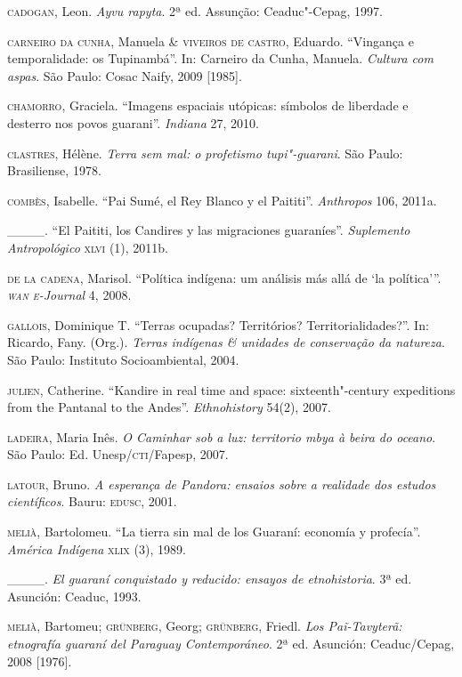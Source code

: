 \begin{Parskip}
\textsc{cadogan}, Leon. \emph{Ayvu rapyta}. 2ª ed. Assunção: Ceaduc"-Cepag, 1997.

\textsc{carneiro da cunha}, Manuela \& \textsc{viveiros de castro}, Eduardo.
``Vingança e temporalidade: os Tupinambá''. In: Carneiro da Cunha,
Manuela. \emph{Cultura com aspas}. São Paulo: Cosac Naify, 2009 [1985].

\textsc{chamorro}, Graciela. ``Imagens espaciais utópicas: símbolos de
liberdade e desterro nos povos guarani''. \emph{Indiana} 27, 2010. 

\textsc{clastres}, Hélène. \emph{Terra sem mal: o profetismo tupi"-guarani}. São
Paulo: Brasiliense, 1978.

\textsc{combès}, Isabelle. ``Pai Sumé, el Rey Blanco y el Paititi''. \emph{Anthropos}
106, 2011a.

\_\_\_\_. ``El Paititi, los Candires y las migraciones guaraníes''.
\emph{Suplemento Antropológico} \textsc{xlvi} (1), 2011b.

\textsc{de la cadena}, Marisol. ``Política indígena: um análisis más allá de
‘la política’''. \emph{\textsc{wan e}-Journal} 4, 2008.

\textsc{gallois}, Dominique T. ``Terras ocupadas? Territórios?
Territorialidades?''. In: Ricardo, Fany. (Org.). \emph{Terras indígenas \&
unidades de conservação da natureza}. São Paulo: Instituto
Socioambiental, 2004.

\textsc{julien}, Catherine. ``Kandire in real time and space:
sixteenth"-century expeditions from the Pantanal to the Andes''.
\emph{Ethnohistory} 54(2), 2007.

\textsc{ladeira}, Maria Inês. \emph{O Caminhar sob a luz: territorio mbya à beira
do oceano}. São Paulo: Ed. Unesp/\textsc{cti}/Fapesp, 2007.

\textsc{latour}, Bruno. \emph{A esperança de Pandora: ensaios sobre a realidade
dos estudos científicos}. Bauru: \textsc{edusc}, 2001.

\textsc{melià}, Bartolomeu. ``La tierra sin mal de los Guaraní: economía y
profecía''. \emph{América Indígena} \textsc{xlix} (3), 1989.

\_\_\_\_. \emph{El guaraní conquistado y reducido: ensayos de etnohistoria}.
3ª ed. Asunción: Ceaduc, 1993.

\textsc{melià}, Bartomeu; \textsc{grünberg}, Georg; \textsc{grünberg}, Friedl. \emph{Los
Paĩ-Tavyterã: etnografía guaraní del Paraguay Contemporáneo}. 2ª
ed. Asunción: Ceaduc/Cepag, 2008 [1976].


\end{Parskip}
